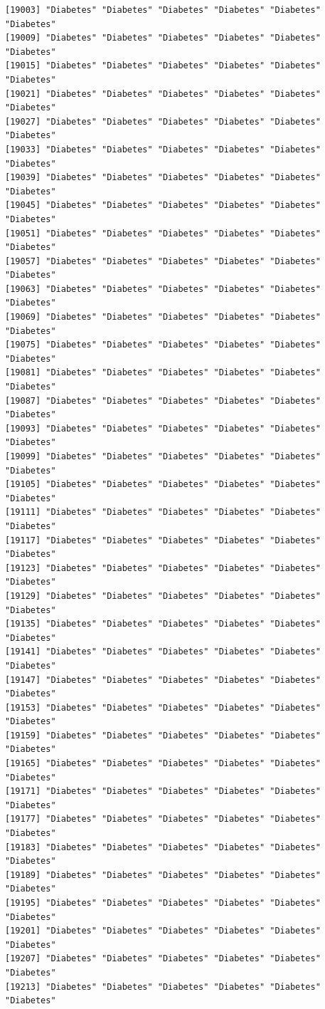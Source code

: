 \documentclass[
  letterpaper,
  DIV=11,
  numbers=noendperiod]{scrartcl}
\begin{document}
\begin{verbatim}
[19003] "Diabetes" "Diabetes" "Diabetes" "Diabetes" "Diabetes" "Diabetes"
[19009] "Diabetes" "Diabetes" "Diabetes" "Diabetes" "Diabetes" "Diabetes"
[19015] "Diabetes" "Diabetes" "Diabetes" "Diabetes" "Diabetes" "Diabetes"
[19021] "Diabetes" "Diabetes" "Diabetes" "Diabetes" "Diabetes" "Diabetes"
[19027] "Diabetes" "Diabetes" "Diabetes" "Diabetes" "Diabetes" "Diabetes"
[19033] "Diabetes" "Diabetes" "Diabetes" "Diabetes" "Diabetes" "Diabetes"
[19039] "Diabetes" "Diabetes" "Diabetes" "Diabetes" "Diabetes" "Diabetes"
[19045] "Diabetes" "Diabetes" "Diabetes" "Diabetes" "Diabetes" "Diabetes"
[19051] "Diabetes" "Diabetes" "Diabetes" "Diabetes" "Diabetes" "Diabetes"
[19057] "Diabetes" "Diabetes" "Diabetes" "Diabetes" "Diabetes" "Diabetes"
[19063] "Diabetes" "Diabetes" "Diabetes" "Diabetes" "Diabetes" "Diabetes"
[19069] "Diabetes" "Diabetes" "Diabetes" "Diabetes" "Diabetes" "Diabetes"
[19075] "Diabetes" "Diabetes" "Diabetes" "Diabetes" "Diabetes" "Diabetes"
[19081] "Diabetes" "Diabetes" "Diabetes" "Diabetes" "Diabetes" "Diabetes"
[19087] "Diabetes" "Diabetes" "Diabetes" "Diabetes" "Diabetes" "Diabetes"
[19093] "Diabetes" "Diabetes" "Diabetes" "Diabetes" "Diabetes" "Diabetes"
[19099] "Diabetes" "Diabetes" "Diabetes" "Diabetes" "Diabetes" "Diabetes"
[19105] "Diabetes" "Diabetes" "Diabetes" "Diabetes" "Diabetes" "Diabetes"
[19111] "Diabetes" "Diabetes" "Diabetes" "Diabetes" "Diabetes" "Diabetes"
[19117] "Diabetes" "Diabetes" "Diabetes" "Diabetes" "Diabetes" "Diabetes"
[19123] "Diabetes" "Diabetes" "Diabetes" "Diabetes" "Diabetes" "Diabetes"
[19129] "Diabetes" "Diabetes" "Diabetes" "Diabetes" "Diabetes" "Diabetes"
[19135] "Diabetes" "Diabetes" "Diabetes" "Diabetes" "Diabetes" "Diabetes"
[19141] "Diabetes" "Diabetes" "Diabetes" "Diabetes" "Diabetes" "Diabetes"
[19147] "Diabetes" "Diabetes" "Diabetes" "Diabetes" "Diabetes" "Diabetes"
[19153] "Diabetes" "Diabetes" "Diabetes" "Diabetes" "Diabetes" "Diabetes"
[19159] "Diabetes" "Diabetes" "Diabetes" "Diabetes" "Diabetes" "Diabetes"
[19165] "Diabetes" "Diabetes" "Diabetes" "Diabetes" "Diabetes" "Diabetes"
[19171] "Diabetes" "Diabetes" "Diabetes" "Diabetes" "Diabetes" "Diabetes"
[19177] "Diabetes" "Diabetes" "Diabetes" "Diabetes" "Diabetes" "Diabetes"
[19183] "Diabetes" "Diabetes" "Diabetes" "Diabetes" "Diabetes" "Diabetes"
[19189] "Diabetes" "Diabetes" "Diabetes" "Diabetes" "Diabetes" "Diabetes"
[19195] "Diabetes" "Diabetes" "Diabetes" "Diabetes" "Diabetes" "Diabetes"
[19201] "Diabetes" "Diabetes" "Diabetes" "Diabetes" "Diabetes" "Diabetes"
[19207] "Diabetes" "Diabetes" "Diabetes" "Diabetes" "Diabetes" "Diabetes"
[19213] "Diabetes" "Diabetes" "Diabetes" "Diabetes" "Diabetes" "Diabetes"

\end{verbatim}
\end{document}
